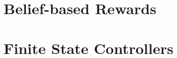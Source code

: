 \documentclass{report}
\theoremstyle{definition}
\theoremstyle{remark}
\begin{document}
	\chapter{Belief-based Rewards}
	
	
	\chapter{Finite State Controllers}
	
	
	
	
	

	\newpage
	
	
	
	
	
\end{document}
